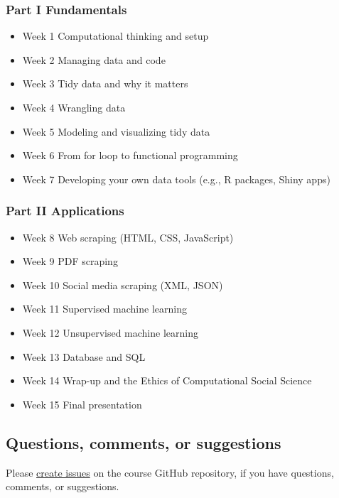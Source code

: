 \documentclass[
]{article}
\providecommand{\tightlist}{%
  \setlength{\itemsep}{0pt}\setlength{\parskip}{0pt}}
\begin{document}
\hypertarget{part-i-fundamentals-1}{%
\subsubsection{Part I Fundamentals}\label{part-i-fundamentals-1}}

\begin{itemize}
\tightlist
\item
  Week 1 Computational thinking and setup
\item
  Week 2 Managing data and code
\item
  Week 3 Tidy data and why it matters
\item
  Week 4 Wrangling data
\item
  Week 5 Modeling and visualizing tidy data
\item
  Week 6 From for loop to functional programming
\item
  Week 7 Developing your own data tools (e.g., R packages, Shiny apps)
\end{itemize}

\hypertarget{part-ii-applications-1}{%
\subsubsection{Part II Applications}\label{part-ii-applications-1}}

\begin{itemize}
\tightlist
\item
  Week 8 Web scraping (HTML, CSS, JavaScript)
\item
  Week 9 PDF scraping
\item
  Week 10 Social media scraping (XML, JSON)
\item
  Week 11 Supervised machine learning
\item
  Week 12 Unsupervised machine learning
\item
  Week 13 Database and SQL
\item
  Week 14 Wrap-up and the Ethics of Computational Social Science
\item
  Week 15 Final presentation
\end{itemize}

\hypertarget{questions-comments-or-suggestions}{%
\subsection{Questions, comments, or
suggestions}\label{questions-comments-or-suggestions}}

Please \href{https://github.com/PS239T/spring_2021/issues}{create
issues} on the course GitHub repository, if you have questions,
comments, or suggestions.
\end{document}

